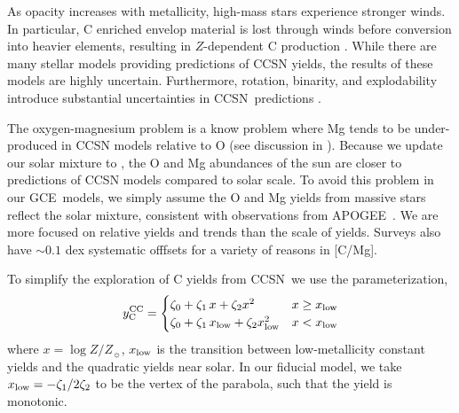 \documentclass[fleqn,
referee, %
usenatbib]{mnras}
\newcommand{\apogee}{APOGEE}
\newcommand{\cc}{CCSN}
\newcommand{\gce}{GCE}
\newcommand{\Ycc}{{y_{\rm C}^{\rm CC}}}
\newcommand{\zetao}{\zeta_0}
\newcommand{\zetai}{\zeta_{1}}
\newcommand{\zetaii}{\zeta_{2}}
\newcommand{\Zl}{x_{\rm low}}
\newcommand{\Zo}{ Z_{\sun}}
\newcommand{\about}[1]{${\sim} #1$}
\begin{document}
As opacity increases with metallicity, high-mass stars experience stronger winds. In particular, C enriched envelop material is lost through winds before conversion into heavier elements, resulting in $Z$-dependent C production \citep{LC18}.
While there are many stellar models providing predictions of \cc{} yields, the results of these models are highly uncertain. Furthermore, rotation, binarity, and explodability introduce substantial uncertainties in \cc\ predictions \citep{farmer+21}.

The oxygen-magnesium problem is a know problem where Mg tends to be under-produced in CCSN models relative to 
 O (see discussion in \citealt{emily+21}). Because we update our solar mixture to \citet{magg+22}, the O and Mg abundances of the sun are closer to predictions of CCSN models compared to \citet{asplund+09} solar scale. 
To avoid this problem in our \gce\ models, we simply assume the O and Mg yields from massive stars reflect the solar mixture, consistent with observations from \apogee\ \citep{weinberg+19, weinberg+22, david_fe}. We are more focused on relative yields and trends than the scale of yields. Surveys also have \about{0.1} dex systematic offfsets for a variety of reasons in [C/Mg]. 

To simplify the exploration of C yields from \cc\, we use the parameterization, 
\begin{equation}\label{eq:y_cc}
    \Ycc = \begin{cases}
    \zetao + \zetai\,x + \zetaii x^2 & x \geq \Zl
    \\
    \zetao + \zetai\,\Zl + \zetaii \Zl^2 & x < \Zl
    \end{cases}
\end{equation}
where $x=\log Z/\Zo$, $x_{\rm low}$ is the transition between low-metallicity constant yields and the quadratic yields near solar.
In our fiducial model, we take $x_{\rm low} = -\zetai / 2\zetaii$ to be the vertex of the parabola, such that the yield is monotonic. 
\end{document}
